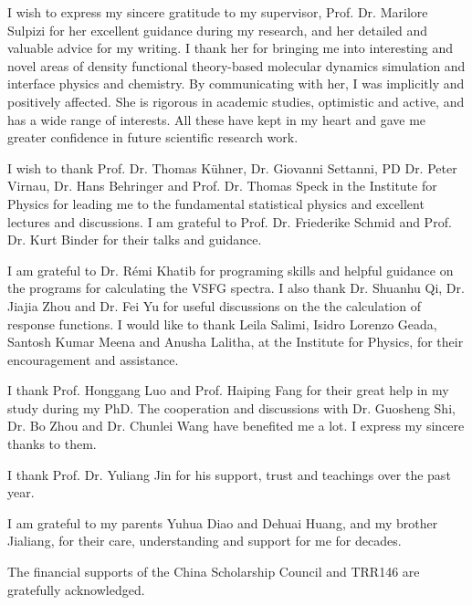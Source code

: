 \documentclass[
11pt, %
english, %
singlespacing, %
headsepline, %
]{MastersDoctoralThesis} %
\begin{document}
\begin{acknowledgements}
\addchaptertocentry{\acknowledgementname} %
I wish to express my sincere gratitude to my supervisor,
Prof. Dr. Marilore Sulpizi for her excellent guidance during my research, and her detailed and valuable advice for my writing.
I thank her for bringing me into interesting and novel areas of density functional theory-based molecular dynamics simulation 
and interface physics and chemistry. By communicating with her, I was implicitly and positively affected. 
She is rigorous in academic studies, optimistic and active, and has a wide range of interests. 
All these have kept in my heart and gave me greater confidence in future scientific research work.

%
I wish to thank Prof. Dr. Thomas Kühner, Dr. Giovanni Settanni, PD Dr. Peter
Virnau, Dr. Hans Behringer and Prof. Dr. Thomas Speck in the Institute for
Physics for leading me to the fundamental statistical physics and excellent lectures
and discussions. I am grateful to Prof. Dr. Friederike Schmid and Prof. Dr. Kurt
Binder for their talks and guidance.

%
I am grateful to Dr. R\'emi Khatib for programing skills and helpful guidance on
the programs for calculating the VSFG spectra. I also thank Dr. Shuanhu Qi, Dr. Jiajia Zhou and Dr. Fei Yu for useful discussions 
on the the calculation of response functions. I would like to
thank Leila Salimi, Isidro Lorenzo Geada, Santosh Kumar Meena and Anusha Lalitha, 
at the Institute for Physics, for their encouragement and assistance.

%
I thank Prof. Honggang Luo and Prof. Haiping Fang for their great help in my study during my PhD. 
The cooperation and discussions with Dr. Guosheng Shi, Dr. Bo Zhou and Dr. Chunlei Wang have benefited me a lot. 
I express my sincere thanks to them.

%
I thank Prof. Dr. Yuliang Jin for his support, trust and teachings over the past year.

%
I am grateful to my parents Yuhua Diao and Dehuai Huang, and my brother Jialiang, for their care, 
understanding and support for me for decades. 

%
The financial supports of the China Scholarship Council and TRR146 are gratefully acknowledged.
\end{acknowledgements}

{
\hypersetup{linkcolor=black}
\tableofcontents %
}
\end{document}
